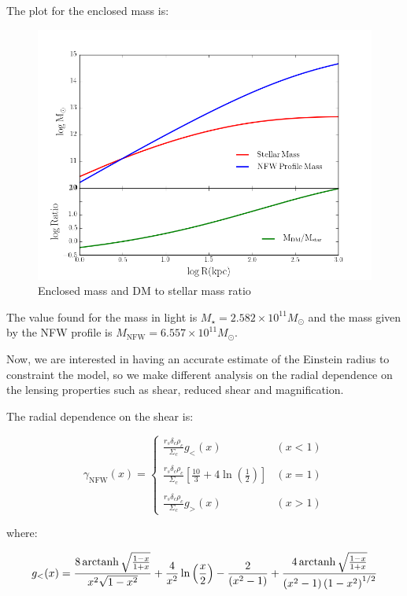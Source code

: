 The plot for the enclosed mass is:

\begin{figure}[H]
\centering
\includegraphics[width=12cm]{images/DM_fraction.png}
\caption[Enclosed mass and DM to stellar mass ratio]{Enclosed mass and DM to stellar mass ratio}
\end{figure}

The value found for the mass in light is $M_{\star}=2.582\times 10^{11}M_{\odot}$ and the mass given by the NFW profile is $M_{\text{NFW}}=6.557\times 10^{11}M_{\odot}$.

Now, we are interested in having an accurate estimate of the Einstein radius to constraint the model, so we make different analysis on the radial dependence on the lensing properties such as shear, reduced shear and magnification.

The radial dependence on the shear is:

\begin{equation}
\gamma_{\text{NFW}}(x) = \left\lbrace
\begin{array}{lll}
\frac{r_{s}\delta_{c}\rho_{c}}{\Sigma_c}g_{<}(x) & (x<1)\\\\
\frac{r_{s}\delta_{c}\rho_{c}}{\Sigma_c}\left[\frac{10}{3}+4 \ln \left(\frac{1}{2}\right)\right] & (x=1)\\\\
\frac{r_{s}\delta_{c}\rho_{c}}{\Sigma_c}g_{>}(x) & (x>1)
\end{array}
\right.
\end{equation} 

where: 

\begin{equation}
g_{<}(x)=\frac{8 \operatorname{arctanh} \sqrt{\frac{1-x}{1+x}}}{x^{2}\sqrt{1-x^{2}}}+\frac{4}{x^{2}} \ln \left(\frac{x}{2}\right)-\frac{2}{\left(x^{2}-1\right)}+\frac{4 \operatorname{arctanh} \sqrt{\frac{1-x}{1+x}}}{\left(x^{2}-1\right)\left(1-x^{2}\right)^{1/2}}
\end{equation}

